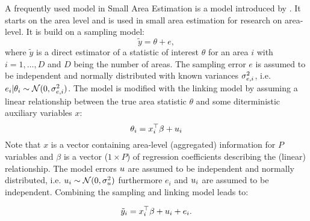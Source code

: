 A frequently used model in Small Area Estimation is a model introduced
by \textcite{Fay79}. It starts on the area level and is used in small
area estimation for research on area-level. It is build on a sampling
model: \[
\si{\tilde{y}} = \si{\theta} + \si{e},
\] where $\si{\tilde{y}}$ is a direct estimator of a statistic of
interest $\si{\theta}$ for an area $i$ with $i = 1, \dots, D$ and $D$
being the number of areas. The sampling error $\si{e}$ is assumed to be
independent and normally distributed with known variances $\sigma_{e, i}^2$, i.e.
$e_i|\theta_i \sim \mathcal{N}(0, \sigma_{e, i}^2)$. The model is modified
with the linking model by assuming a linear relationship between the
true area statistic $\si{\theta}$ and some diterministic auxiliary
variables $\si{x}$: \[
\theta_i = x_i^\top \beta + u_i
\] Note that $\si{x}$ is a vector containing area-level (aggregated)
information for $P$ variables and $\beta$ is a vector ($1\times P$) of
regression coefficients describing the (linear) relationship. The model
errors $u$ are assumed to be independent and normally distributed,
i.e. $u_i \sim \mathcal{N}(0, \sigma_{u}^2)$ furthermore $e_i$ and $u_i$ are
assumed to be independent. Combining the sampling and linking model
leads to:

\begin{align}
\label{eq:FH}
\tilde{y}_i = x_i^\top \beta + u_i + e_i.
\end{align}
